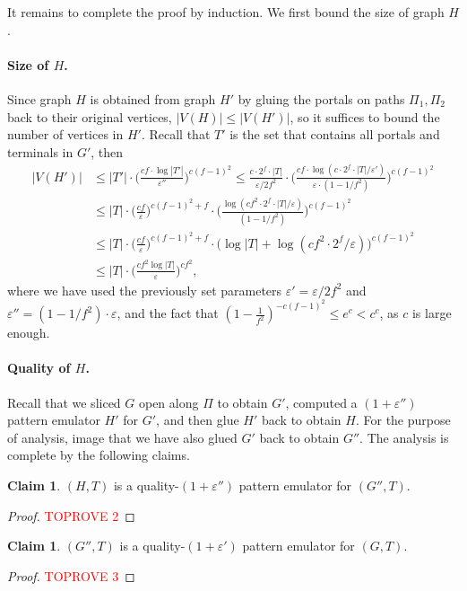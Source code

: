 \documentclass[11pt]{article}
\theoremstyle{definition}
\newtheorem{claim}[theorem]{Claim}
\newcommand{\eps}{{\varepsilon}}
\begin{document}
It remains to complete the proof by induction. We first bound the size of graph $H$.
 
\paragraph{Size of $H$.} Since graph $H$ is obtained from graph $H'$ by gluing the portals on paths $\Pi_1,\Pi_2$ back to their original vertices, $|V(H)|\le |V(H')|$, so it suffices to bound the number of vertices in $H'$.
Recall that $T'$ is the set that contains all portals and terminals in $G'$, then
\[
\begin{split}
|V(H')| &
\le |T'|\cdot \bigg(\frac{cf\cdot \log |T'|}{\eps''}\bigg)^{c(f-1)^2}
\le \frac{c\cdot 2^f\cdot |T|}{\eps/2f^2}\cdot \bigg(\frac{cf\cdot \log (c\cdot 2^f\cdot |T|/\eps')}{\eps\cdot (1-1/f^2)}\bigg)^{c(f-1)^2}\\
&  \le |T|\cdot \bigg(\frac{cf}{\eps}\bigg)^{c(f-1)^2+f}\cdot \bigg(\frac{\log (cf^2\cdot 2^f\cdot |T|/\eps)}{(1-1/f^2)}\bigg)^{c(f-1)^2}\\
& \le |T|\cdot \bigg(\frac{cf}{\eps}\bigg)^{c(f-1)^2+f}\cdot \bigg(\log |T|+ \log (cf^2\cdot 2^f/\eps)\bigg)^{c(f-1)^2}\\
& \le |T|\cdot \bigg(\frac{cf^2 \log |T|}{\eps}\bigg)^{cf^2},
\end{split}
\]
where we have used the previously set parameters $\eps'=\eps/2f^2$ and $\eps''=(1-1/f^2)\cdot \eps$, and the fact that $(1-\frac{1}{f^2})^{-c(f-1)^2}\le e^{c}< c^{c}$, as $c$ is large enough.



\paragraph{Quality of $H$.}
Recall that we sliced $G$ open along $\Pi$ to obtain $G'$, computed a $(1+\eps'')$ pattern emulator $H'$ for $G'$, and then glue $H'$ back to obtain $H$.
For the purpose of analysis, image that we have also glued $G'$ back to obtain $G''$. The analysis is complete by the following claims.



\begin{claim}
\label{clm: cut glue emulator}
$(H,T)$ is a quality-$(1+\eps'')$ pattern emulator for $(G'',T)$.
\end{claim}
\begin{proof}\textcolor{red}{TOPROVE 2}\end{proof}

\begin{claim}
	\label{clm: cut glue}
	$(G'',T)$ is a quality-$(1+\eps')$ pattern emulator for $(G,T)$.
\end{claim}
\begin{proof}\textcolor{red}{TOPROVE 3}\end{proof}
\end{document}
